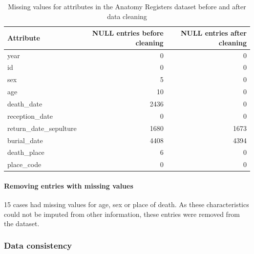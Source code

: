 \begin{table}[p]
\centering
\caption{Missing values for attributes in the Anatomy Registers dataset before and after data cleaning}
\label{tab:missing-values}
\singlespacing
\begin{tabular}{@{}lrr@{}}
\toprule
\textbf{Attribute}                        & \textbf{NULL entries before cleaning} & \textbf{NULL entries after cleaning} \\ \midrule
year                    & 0                               &  0                             \\
id                      & 0                               &  0                             \\
sex                     & 5                               &  0                             \\
age                     & 10                              &  0                             \\
death\_date             & 2436                            &  0                             \\
reception\_date         & 0                               &  0                             \\
return\_date\_sepulture & 1680                            &  1673                          \\
burial\_date            & 4408                            &  4394                          \\
death\_place            & 6                               &  0                             \\
place\_code             & 0                               &  0                             \\ \bottomrule
\end{tabular}
\end{table}

\paragraph{Removing entries with missing values} 15 cases had missing values for age, sex or place of death.  As these characteristics could not be imputed from other information, these entries were removed from the dataset. 

\subsubsection{Data consistency}

